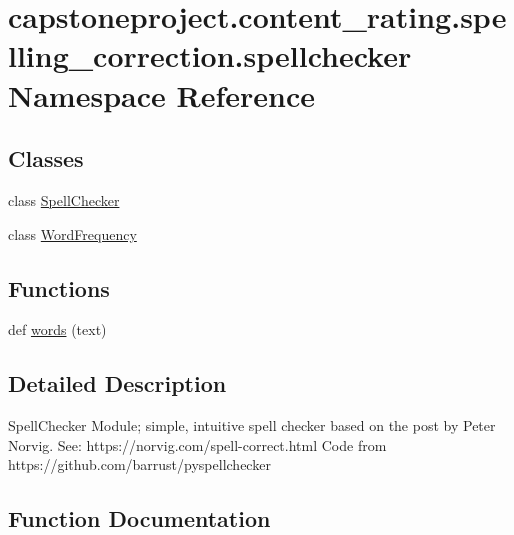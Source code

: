 \hypertarget{namespacecapstoneproject_1_1content__rating_1_1spelling__correction_1_1spellchecker}{}\section{capstoneproject.\+content\+\_\+rating.\+spelling\+\_\+correction.\+spellchecker Namespace Reference}
\label{namespacecapstoneproject_1_1content__rating_1_1spelling__correction_1_1spellchecker}
\subsection*{Classes}
\begin{DoxyCompactItemize}
\item 
class \mbox{\hyperlink{classcapstoneproject_1_1content__rating_1_1spelling__correction_1_1spellchecker_1_1_spell_checker}{Spell\+Checker}}
\item 
class \mbox{\hyperlink{classcapstoneproject_1_1content__rating_1_1spelling__correction_1_1spellchecker_1_1_word_frequency}{Word\+Frequency}}
\end{DoxyCompactItemize}
\subsection*{Functions}
\begin{DoxyCompactItemize}
\item 
def \mbox{\hyperlink{namespacecapstoneproject_1_1content__rating_1_1spelling__correction_1_1spellchecker_a4ab1d9ccddc3e0703cea49bc4b51df88}{words}} (text)
\end{DoxyCompactItemize}


\subsection{Detailed Description}
\begin{DoxyVerb}SpellChecker Module; simple, intuitive spell checker based on the post by Peter Norvig.
See: https://norvig.com/spell-correct.html
Code from https://github.com/barrust/pyspellchecker
\end{DoxyVerb}
 

\subsection{Function Documentation}
\mbox{\label{namespacecapstoneproject_1_1content__rating_1_1spelling__correction_1_1spellchecker_a4ab1d9ccddc3e0703cea49bc4b51df88}} 
